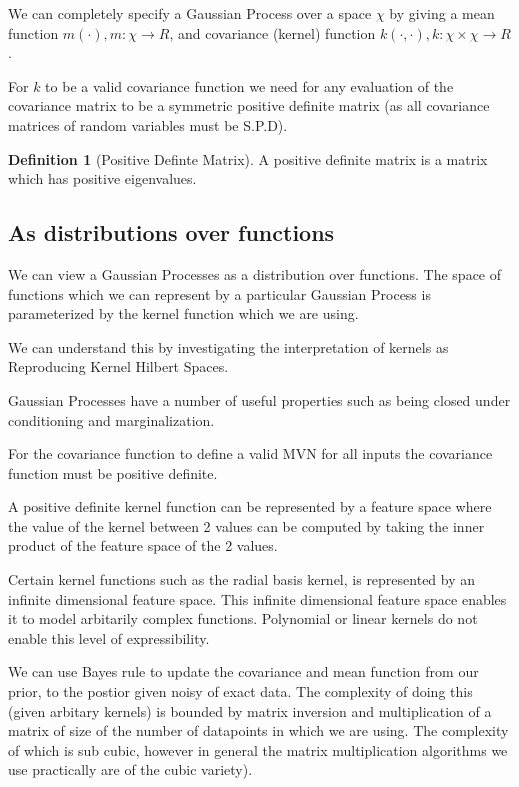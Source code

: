 \documentclass[12pt, a4paper]{report}
\theoremstyle{definition}
\newtheorem{definition}{Definition}[section]
\begin{document}
We can completely specify a Gaussian Process over a space $\chi$ by giving a mean function $m(\cdot), m : \chi \rightarrow R$, and covariance (kernel) function $k(\cdot, \cdot), k: \chi \times \chi \rightarrow R$.


For $k$ to be a valid covariance function we need for any evaluation of the covariance matrix to be a symmetric positive definite matrix (as all covariance matrices of random variables must be S.P.D).

\begin{definition}[Positive Definte Matrix]
    A positive definite matrix is a matrix which has positive eigenvalues.
\end{definition}

\subsection{As distributions over functions}

We can view a Gaussian Processes as a distribution over functions. The space of functions which we can represent by a particular Gaussian Process is parameterized by the kernel function which we are using.

We can understand this by investigating the interpretation of kernels as Reproducing Kernel Hilbert Spaces.





Gaussian Processes have a number of useful properties such as being closed under conditioning and marginalization.

For the covariance function to define a valid MVN for all inputs the covariance function must be positive definite.

A positive definite kernel function can be represented by a feature space where the value of the kernel between 2 values can be computed by taking the inner product of the feature space of the 2 values.

Certain kernel functions such as the radial basis kernel, is represented by an infinite dimensional feature space. This infinite dimensional feature space enables it to model arbitarily complex functions. Polynomial or linear kernels do not enable this level of expressibility.

We can use Bayes rule to update the covariance and mean function from our prior, to the postior given noisy of exact data. The complexity of doing this (given arbitary kernels) is bounded by matrix inversion and  multiplication of a matrix of size of the number of datapoints in which we are using. The complexity of which is sub cubic, however in general the matrix multiplication algorithms we use practically are of the cubic variety).
\end{document}
